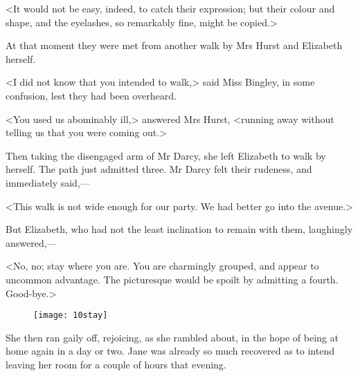 <It would not be easy, indeed, to catch their expression; but their colour and shape, and the eyelashes, so remarkably fine, might be copied.>

At that moment they were met from another walk by Mrs Hurst and Elizabeth herself.

<I did not know that you intended to walk,> said Miss Bingley, in some confusion, lest they had been overheard.

<You used us abominably ill,> answered Mrs Hurst, <running away without telling us that you were coming out.>

Then taking the disengaged arm of Mr Darcy, she left Elizabeth to walk by herself. The path just admitted three. Mr Darcy felt their rudeness, and immediately said,—

<This walk is not wide enough for our party. We had better go into the avenue.>

But Elizabeth, who had not the least inclination to remain with them, laughingly answered,—

<No, no; stay where you are. You are charmingly grouped, and appear to uncommon advantage. The picturesque would be spoilt by admitting a fourth. Good-bye.>

\begin{figure}[tbph]
\centering
\texttt{[image: 10stay]}
\end{figure}

She then ran gaily off, rejoicing, as she rambled about, in the hope of being at home again in a day or two. Jane was already so much recovered as to intend leaving her room for a couple of hours that evening.